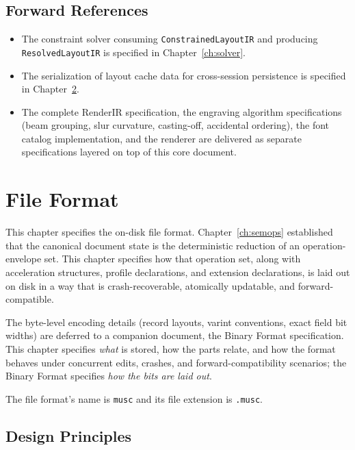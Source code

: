 \documentclass[11pt,letterpaper]{report}
\begin{document}
\section{Forward References}
\label{sec:layoutir:forward}

\begin{itemize}
  \item The constraint solver consuming \texttt{ConstrainedLayoutIR}
    and producing \texttt{ResolvedLayoutIR} is specified in
    Chapter~\ref{ch:solver}.
  \item The serialization of layout cache data for cross-session
    persistence is specified in Chapter~\ref{ch:format}.
  \item The complete RenderIR specification, the engraving algorithm
    specifications (beam grouping, slur curvature, casting-off,
    accidental ordering), the font catalog implementation, and the
    renderer are delivered as separate specifications layered on top
    of this core document.
\end{itemize}

\chapter{File Format}
\label{ch:format}

This chapter specifies the on-disk file format. Chapter~\ref{ch:semops}
established that the canonical document state is the deterministic
reduction of an operation-envelope set. This chapter specifies how
that operation set, along with acceleration structures, profile
declarations, and extension declarations, is laid out on disk in a
way that is crash-recoverable, atomically updatable, and forward-
compatible.

The byte-level encoding details (record layouts, varint conventions,
exact field bit widths) are deferred to a companion document, the
Binary Format specification. This chapter specifies \emph{what} is
stored, how the parts relate, and how the format behaves under
concurrent edits, crashes, and forward-compatibility scenarios; the
Binary Format specifies \emph{how the bits are laid out}.

The file format's name is \texttt{musc} and its file extension is
\texttt{.musc}.

\section{Design Principles}
\label{sec:format:principles}
\end{document}
